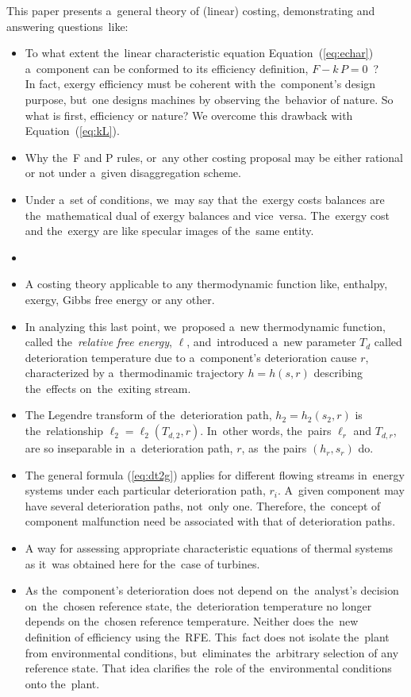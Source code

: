 \documentclass[energies,article,accept,moreauthors,pdftex]{Definitions/mdpi}
\begin{document}
This paper presents a~general theory of (linear) costing, demonstrating and answering questions~like:
\begin{itemize}[leftmargin=*,labelsep=5.5mm]
	\item To what extent the~linear characteristic equation Equation~(\ref{eq:echar}) a~component can be conformed to its efficiency definition, $F - k\, P = 0$~?\\
	In fact, exergy efficiency must be coherent with the~component's design purpose, but~one designs machines by observing the~behavior of nature. So what is first, efficiency or nature? We overcome this drawback with Equation~(\ref{eq:kL}).
	\item Why the~F and P rules, or~any other costing proposal may be either rational or not under a~given disaggregation scheme.
	\item Under a~set of conditions, we~may say that the~exergy costs balances are the~mathematical dual of exergy balances and vice~versa. The~exergy cost and the~exergy are like specular images of the~same entity.
	\item {}
	\item A costing theory applicable to any thermodynamic function like, enthalpy, exergy, Gibbs free energy or any other.
	\item In analyzing this last point, we~proposed a~new thermodynamic function, called the~\emph{relative free energy}, $\ell$, and~introduced a~new parameter $T_d$ called deterioration temperature due to a~component’s deterioration cause $r$, characterized by a~thermodinamic trajectory $h=h(s, r)$ describing the~effects on~the~exiting stream.
	\item The Legendre transform of the~deterioration path, $h_2=h_2 (s_2, r)$ is the~relationship
	$\ell_2 = \ell_2(T_{d,2} , r)$. In~other words, the~pairs  $\ell_r$ and $T_{d,r}$, are so inseparable in~a~deterioration path, $r$, as~the pairs $(h_r,s_r)$ do.
	\item The general formula (\ref{eq:dt2g}) applies for different flowing streams in~energy systems under each particular deterioration path, $r_i$. A~given component may have several deterioration paths, not~only one. Therefore, the~concept of component malfunction need be associated with that of deterioration paths.
	\item A way for assessing appropriate characteristic equations of thermal systems as it~was obtained here for the~case of  turbines.
	\item As the~component's deterioration  does not depend on~the~analyst's decision on~the~chosen reference state, the~deterioration temperature no longer  depends on  the~chosen reference temperature.  Neither does the~new definition of efficiency using the~RFE. This~fact does not isolate the~plant from environmental conditions, but~eliminates the~arbitrary selection of any reference state. That idea clarifies the~role of the~environmental conditions onto the~plant.
\end{itemize}
\end{document}

